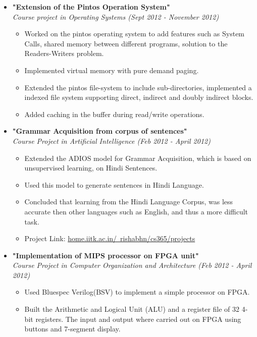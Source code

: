 \documentclass[margin,line]{resume}
\begin{document}
\begin{resume}
\begin{itemize}
      \newpage

    \item \large{\textbf{\textsf{"Extension of the Pintos Operation System"}}}
      \\ \small{\textit{Course project in Operating Systems (Sept 2012 - November 2012)}}
      \normalsize
      \begin{itemize}
      \item Worked on the pintos operating system to add features such as System Calls, shared memory between different programs, solution to the Readers-Writers problem.
      \item Implemented virtual memory with pure demand paging.
      \item Extended the pintos file-system to include sub-directories, implemented a indexed file system supporting direct, indirect and doubly indirect blocks. 
      \item Added caching in the buffer during read/write operations. 
      \end{itemize}

    \item \large{\textbf{\textsf{"Grammar Acquisition from corpus of sentences"}}}
      \\ \small{\textit{Course Project in Artificial Intelligence (Feb 2012 - April 2012)}}
      \normalsize
      \begin{itemize}
      \item Extended the ADIOS model for Grammar Acquisition, which is based on unsupervised learning, on Hindi Sentences. 
      \item Used this model to generate sentences in Hindi Language.
      \item Concluded that learning from the Hindi Language Corpus, was less accurate then other languages such as English, and thus a more difficult task.
      \item Project Link: \href{http://home.iitk.ac.in/~rishabhn/cs365/projects}{home.iitk.ac.in/~rishabhn/cs365/projects}
      \end{itemize}


    \item \large{\textbf{\textsf{"Implementation of MIPS processor on FPGA unit"}}}
      \\ \small{\textit{Course Project in Computer Organization and Architecture (Feb 2012 - April 2012)}}
      \normalsize
      \begin{itemize}
      \item Used Bluespec Verilog(BSV) to implement a simple processor on FPGA.
      \item Built the Arithmetic and Logical Unit (ALU) and a register file of 32 4-bit registers. The input and output where carried out on FPGA using buttons and 7-segment display.  
      \end{itemize}


\end{itemize}
\end{resume}
\end{document}
